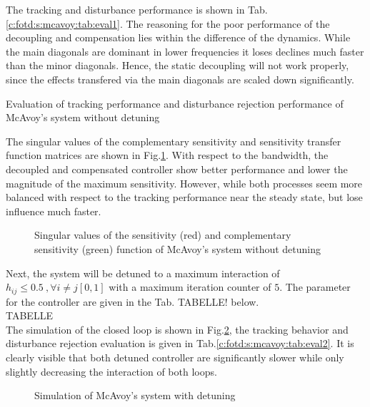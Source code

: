 The tracking and disturbance performance is shown in Tab.\ref{c:fotd:s:mcavoy:tab:eval1}. The reasoning for the poor performance of the decoupling and compensation lies within the difference of the dynamics. While the main diagonals are dominant in lower frequencies it loses declines much faster than the minor diagonals. Hence, the static decoupling will not work properly, since the effects transfered via the main diagonals are scaled down significantly.

\begin{table}[H]
\centering
\caption{Evaluation of tracking performance and disturbance rejection performance of McAvoy's system without detuning}
\label{c:fotd:s:mcavoy:tab:eval1}

\end{table}

The singular values of the complementary sensitivity and sensitivity transfer function matrices are shown in Fig.\ref{c:fotd:s:mcavoy:f:SingValNotDetuned}. With respect to the bandwidth, the decoupled and compensated controller show better performance and lower the magnitude of the maximum sensitivity. However, while both processes seem more balanced with respect to the tracking performance near the steady state, but lose influence much faster.\\

\begin{figure}[H]\centering

\caption{Singular values of the sensitivity (red) and complementary sensitivity (green) function of  McAvoy's system without detuning}
\label{c:fotd:s:mcavoy:f:SingValNotDetuned}
\end{figure}

Next, the system will be detuned to a maximum interaction of $h_{ij}\leq 0.5~,\forall i\neq j \left[ 0,1\right]$ with a maximum iteration counter of $5$. The parameter for the controller are given in the Tab. TABELLE! below.\\

TABELLE\\

The simulation of the closed loop is shown in Fig.\ref{c:fotd:s:mcavoy:f:SimDetuned}, the tracking behavior and disturbance rejection evaluation is given in Tab.\ref{c:fotd:s:mcavoy:tab:eval2}. It is clearly visible that both detuned controller are significantly slower while only slightly decreasing the interaction of both loops. 

\begin{figure}[H]\centering

\caption{Simulation of McAvoy's system with detuning}
\label{c:fotd:s:mcavoy:f:SimDetuned}
\end{figure}

